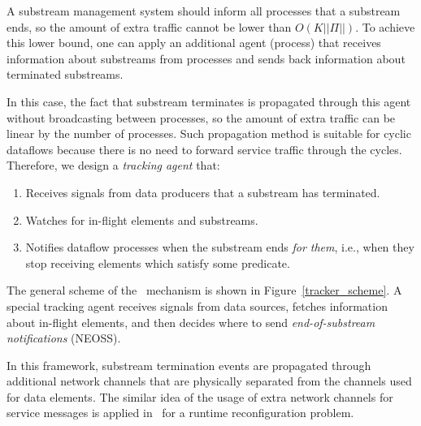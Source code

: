 \label{fs-acker-tracker}


A substream management system should inform all processes that a substream ends, so the amount of extra traffic cannot be lower than $O(K||\Pi||)$. To achieve this lower bound, one can apply an additional agent (process) that receives information about substreams from processes and sends back information about terminated substreams. 

In this case, the fact that substream terminates is propagated through this agent without broadcasting between processes, so the amount of extra traffic can be linear by the number of processes. Such propagation method is suitable for cyclic dataflows because there is no need to forward service traffic through the cycles. Therefore, we design a {\em tracking agent} that:

\begin{enumerate}
    \item Receives signals from data producers that a substream has terminated.
    \item Watches for in-flight elements and substreams.
    \item Notifies dataflow processes when the substream ends {\em for them}, i.e., when they stop receiving elements which satisfy some predicate.
\end{enumerate}

The general scheme of the \tracker\ mechanism is shown in Figure~\ref{tracker_scheme}. A special tracking agent receives signals from data sources, fetches information about in-flight elements, and then decides where to send {\em end-of-substream notifications} (NEOSS).

In this framework, substream termination events are propagated through additional network channels that are physically separated from the channels used for data elements. The similar idea of the usage of extra network channels for service messages is applied in~\cite{wang2022fries} for a runtime reconfiguration problem.


